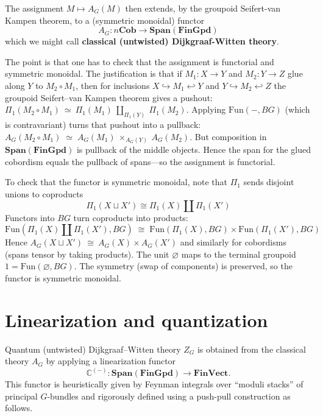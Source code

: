 \documentclass[12pt]{article}
\begin{document}
The assignment $M \mapsto A_G(M)$ then extends, by the groupoid Seifert-van Kampen theorem, to a (symmetric monoidal) functor
\begin{equation} \label{eq:AG-functor-extended}
    A_G : n\mathbf{Cob} \to \mathbf{Span}(\mathbf{FinGpd})
\end{equation}
which we might call \textbf{classical (untwisted) Dijkgraaf-Witten theory}.

The point is that one has to check that the assignment is functorial and symmetric monoidal. The justification is that if $M_1:X\to Y$ and $M_2:Y\to Z$ glue along $Y$ to $M_2\circ M_1$, then for inclusions $X\hookrightarrow M_1\hookleftarrow Y$ and $Y\hookrightarrow M_2\hookleftarrow Z$ the groupoid Seifert--van Kampen theorem gives a pushout:
$\Pi_1(M_2\circ M_1)\ \simeq\ \Pi_1(M_1)\ \amalg_{\Pi_1(Y)}\ \Pi_1(M_2)$.
Applying $\mathrm{Fun}(-,BG)$ (which is contravariant) turns that pushout into a pullback:
$A_G(M_2\circ M_1)
    \;\simeq\;
    A_G(M_1)\ \times_{A_G(Y)}\ A_G(M_2)$.
But composition in $\mathbf{Span}(\mathbf{FinGpd})$ is pullback of the middle objects. Hence the span for the glued cobordism equals the pullback of spans—so the assignment is functorial.

To check that the functor is symmetric monoidal, note that $\Pi_1$ sends disjoint unions to coproducts
\[\Pi_1(X\sqcup X')\cong \Pi_1(X)\amalg \Pi_1(X')\]
Functors into $BG$ turn coproducts into products:
\[\mathrm{Fun}(\Pi_1(X)\amalg \Pi_1(X'),BG)
    \;\cong\;
    \mathrm{Fun}(\Pi_1(X),BG)\times \mathrm{Fun}(\Pi_1(X'),BG)\]
Hence $A_G(X\sqcup X')\ \cong\ A_G(X)\times A_G(X')$ and similarly for cobordisms (spans tensor by taking products). The unit $\varnothing$ maps to the terminal groupoid $1=\mathrm{Fun}(\varnothing,BG)$. The symmetry (swap of components) is preserved, so the functor is symmetric monoidal.

\section{Linearization and quantization}
Quantum (untwisted) Dijkgraaf–Witten theory $Z_G$ is obtained from the classical theory $A_G$ by applying a linearization functor
\[
    \mathbb{C}^{(-)} : \mathbf{Span}(\mathbf{FinGpd}) \to \mathbf{FinVect}.
\]
This functor is heuristically given by Feynman integrals over “moduli stacks” of principal $G$-bundles and rigorously defined using a push-pull construction as follows.
\end{document}
